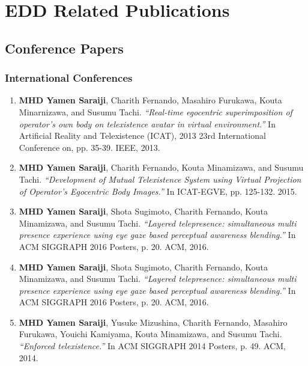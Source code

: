 \pagebreak
\chapter{EDD Related Publications}

\section{Conference Papers}
\subsection{International Conferences}

\footnotesize
\begin{enumerate}
\item \textbf{MHD Yamen Saraiji}, Charith Fernando, Masahiro Furukawa, Kouta Minarnizawa, and Susumu Tachi. \textit{``Real-time egocentric superimposition of operator's own body on telexistence avatar in virtual environment.''} In Artificial Reality and Telexistence (ICAT), 2013 23rd International Conference on, pp. 35-39. IEEE, 2013.

\item  \textbf{MHD Yamen Saraiji}, Charith Fernando, Kouta Minamizawa, and Susumu Tachi. \textit{``Development of Mutual Telexistence System using Virtual Projection of Operator's Egocentric Body Images.''} In ICAT-EGVE, pp. 125-132. 2015.


\item \textbf{MHD Yamen Saraiji}, Shota Sugimoto, Charith Fernando, Kouta Minamizawa, and Susumu Tachi. \textit{``Layered telepresence: simultaneous multi presence experience using eye gaze based perceptual awareness blending.''} In ACM SIGGRAPH 2016 Posters, p. 20. ACM, 2016.

\item \textbf{MHD Yamen Saraiji}, Shota Sugimoto, Charith Fernando, Kouta Minamizawa, and Susumu Tachi. \textit{``Layered telepresence: simultaneous multi presence experience using eye gaze based perceptual awareness blending.''} In ACM SIGGRAPH 2016 Posters, p. 20. ACM, 2016.

\item \textbf{MHD Yamen Saraiji}, Yusuke Mizushina, Charith Fernando, Masahiro Furukawa, Youichi Kamiyama, Kouta Minamizawa, and Susumu Tachi. \textit{``Enforced telexistence.''} In ACM SIGGRAPH 2014 Posters, p. 49. ACM, 2014.

\end{enumerate}

